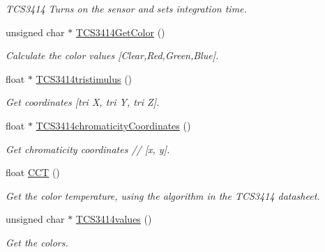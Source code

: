 \begin{DoxyCompactItemize}
\begin{DoxyCompactList}\small\item\em T\+C\+S3414 Turns on the sensor and sets integration time. \end{DoxyCompactList}\item 
\mbox{\label{classGroveColorSensor_a681f093bf14d2f9d544eff3c325ac533}} 
unsigned char $\ast$ \hyperlink{classGroveColorSensor_a681f093bf14d2f9d544eff3c325ac533}{T\+C\+S3414\+Get\+Color} ()
\begin{DoxyCompactList}\small\item\em Calculate the color values \mbox{[}Clear,Red,Green,Blue\mbox{]}. \end{DoxyCompactList}\item 
\mbox{\label{classGroveColorSensor_a655f83dcbe1696743637c083f57eaa5e}} 
float $\ast$ \hyperlink{classGroveColorSensor_a655f83dcbe1696743637c083f57eaa5e}{T\+C\+S3414tristimulus} ()
\begin{DoxyCompactList}\small\item\em Get coordinates \mbox{[}tri X, tri Y, tri Z\mbox{]}. \end{DoxyCompactList}\item 
\mbox{\label{classGroveColorSensor_aeeca525e17589d8cb1bdd7a0cfedc515}} 
float $\ast$ \hyperlink{classGroveColorSensor_aeeca525e17589d8cb1bdd7a0cfedc515}{T\+C\+S3414chromaticity\+Coordinates} ()
\begin{DoxyCompactList}\small\item\em Get chromaticity coordinates // \mbox{[}x, y\mbox{]}. \end{DoxyCompactList}\item 
\mbox{\label{classGroveColorSensor_a40907d4f2a0cca2571660e4744049c40}} 
float \hyperlink{classGroveColorSensor_a40907d4f2a0cca2571660e4744049c40}{C\+CT} ()
\begin{DoxyCompactList}\small\item\em Get the color temperature, using the algorithm in the T\+C\+S3414 datasheet. \end{DoxyCompactList}\item 
\mbox{\label{classGroveColorSensor_ab13e681b298263726748b5e39f98da2d}} 
unsigned char $\ast$ \hyperlink{classGroveColorSensor_ab13e681b298263726748b5e39f98da2d}{T\+C\+S3414values} ()
\begin{DoxyCompactList}\small\item\em Get the colors. \end{DoxyCompactList}\end{DoxyCompactItemize}
